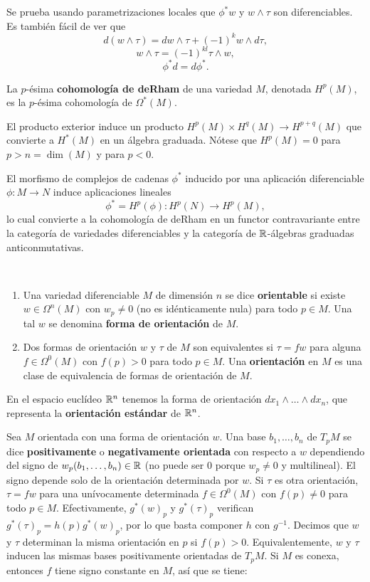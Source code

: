 \documentclass[CV.tex]{subfiles}
\begin{document}
Se prueba usando parametrizaciones locales que $\phi^*w$ y $w\land\tau$ son diferenciables. Es también fácil de ver que
\[
d(w\land\tau)=dw\land\tau+(-1)^kw\land d\tau,
\]
\[
w\land\tau=(-1)^{kl}\tau\land w,
\]
\[
\phi^*d=d\phi^*.
\]

\begin{defi}
La $p$-ésima \textbf{cohomología de deRham} de una variedad $M$, denotada $H^p(M)$, es la $p$-ésima cohomología de $\Omega^*(M)$. 
\end{defi}

El producto exterior induce un producto $H^p(M)\times H^q(M)\to H^{p+q}(M)$ que convierte a $H^*(M)$ en un álgebra graduada. Nótese que $H^p(M)=0$ para $p>n=\dim(M)$ y para $p<0$. 

El morfismo de complejos de cadenas $\phi^*$ inducido por una aplicación diferenciable $\phi:M\to N$ induce aplicaciones lineales
\[
\phi^*=H^p(\phi):H^p(N)\to H^p(M),
\]
lo cual convierte a la cohomología de deRham en un functor contravariante entre la categoría de variedades diferenciables y la categoría de $\mathbb{R}$-álgebras graduadas anticonmutativas.

\begin{defi}\
\begin{enumerate}
\item Una variedad diferenciable $M$ de dimensión $n$ se dice \textbf{orientable} si existe $w\in\Omega^n(M)$ con $w_p\neq 0$ (no es idénticamente nula) para todo $p\in M$. Una tal $w$ se denomina \textbf{forma de orientación} de $M$.
\item Dos formas de orientación $w$ y $\tau$ de $M$ son equivalentes si $\tau=fw$ para alguna $f\in\Omega^0(M)$ con $f(p)>0$ para todo $p\in M$. Una \textbf{orientación} en $M$ es una clase de equivalencia de formas de orientación de $M$. 
\end{enumerate}
\end{defi}

En el espacio euclídeo $\mathbb{R}^n$ tenemos la forma de orientación $dx_1\land\dots\land dx_n$, que representa la \textbf{orientación estándar} de $\mathbb{R}^n$. 

Sea $M$ orientada con una forma de orientación $w$. Una base $b_1,\dots, b_n$ de $T_pM$ se dice \textbf{positivamente} o \textbf{negativamente  orientada} con respecto a $w$ dependiendo del signo de $w_p(b_1,\dots, b_n)\in\mathbb{R}$ (no puede ser 0 porque $w_p\neq 0$ y multilineal). El signo depende solo de la orientación determinada por $w$. Si $\tau$ es otra orientación, $\tau=fw$ para una unívocamente determinada $f\in\Omega^0(M)$ con $f(p)\neq 0$ para todo $p\in M$. Efectivamente, $g^*(w)_p$ y $g^*(\tau)_p$ verifican $g^*(\tau)_p=h(p)g^*(w)_p$, por lo que basta componer $h$ con $g^{-1}$. Decimos que $w$ y $\tau$ determinan la misma orientación en $p$ si $f(p)>0$. Equivalentemente, $w$ y $\tau$ inducen las mismas bases positivamente orientadas de $T_pM$. Si $M$ es conexa, entonces $f$ tiene signo constante en $M$, así que se tiene:
\end{document}

